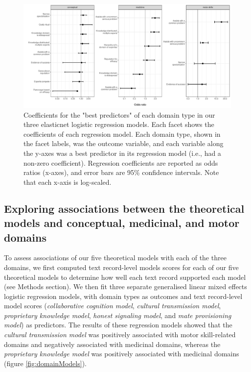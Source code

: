 \documentclass[
  11pt,
]{article}
\begin{document}
\begin{landscape}

\begin{figure}

{\centering \includegraphics{conceptual-experts-paper_files/figure-latex/domainregression-1} 

}

\caption{Coefficients for the "best predictors" of each domain type in our three elasticnet logistic regression models. Each facet shows the coefficients of each regression model. Each domain type, shown in the facet labels, was the outcome variable, and each variable along the y-axes was a best predictor in its regression model (i.e., had a non-zero coefficient). Regression coefficients are reported as odds ratios (x-axes), and error bars are 95\% confidence intervals. Note that each x-axis is log-scaled.}\label{fig:domainregression}
\end{figure}

\end{landscape}

\hypertarget{exploring-associations-between-the-theoretical-models-and-conceptual-medicinal-and-motor-domains}{%
\subsection{Exploring associations between the theoretical models and conceptual, medicinal, and motor domains}\label{exploring-associations-between-the-theoretical-models-and-conceptual-medicinal-and-motor-domains}}

To assess associations of our five theoretical models with each of the three domains, we first computed text record-level models scores for each of our five theoretical models to determine how well each text record supported each model (see Methods section). We then fit three separate generalised linear mixed effects logistic regression models, with domain types as outcomes and text record-level model scores (\emph{collaborative cognition model}, \emph{cultural transmission model}, \emph{proprietary knowledge model}, \emph{honest signaling model}, and \emph{mate provisioning model}) as predictors. The results of these regression models showed that the \emph{cultural transmission model} was positively associated with motor skill-related domains and negatively associated with medicinal domains, whereas the \emph{proprietary knowledge model} was positively associated with medicinal domains (figure \ref{fig:domainModels}).
\end{document}
